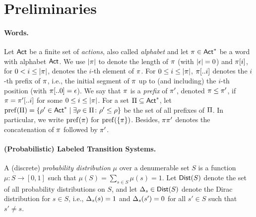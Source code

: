 \section{Preliminaries}
\label{sec:preliminaries}



\paragraph{Words.} Let ${\rm \sf Act}$ be a finite set of \emph{actions}, also called
\emph{alphabet} and let $\pi\in{\rm \sf Act}^*$ be a word with alphabet
${\rm \sf Act}$.  We use ${|}{\pi}{|}$ to denote the length of $\pi$ (with
${|}{\epsilon}{|}=0$) and $\pi[i]$, for $0<i\leq{|}{\pi}{|}$,
denotes the $i$-th element of $\pi$.
%
For $0\leq i\leq{|}{\pi}{|}$, $\pi[..i]$ denotes the $i$-th prefix
of $\pi$, i.e., the initial segment of $\pi$ up to (and including)
the $i$-th position (with $\pi[..0] = \epsilon$).
%
We say that $\pi$ is a \emph{prefix} of $\pi'$, denoted
$\pi\leq\pi'$, if $\pi=\pi'[..i]$ for some $0\leq
i\leq{|}{\pi}{|}$.  For a set $\Pi\subseteq{\rm \sf Act}^*$, let
$\mathrm{pref}(\Pi)=\{\rho'\in{\rm \sf Act}^*\mid{\exists{\rho\in\Pi}\colon{\rho'\leq\rho}}\}$
be the set of all prefixes of $\Pi$.  In particular, we write
$\mathrm{pref}(\pi)$ for $\mathrm{pref}(\{\pi\})$.
%
Besides, $\pi\pi'$ denotes the concatenation of $\pi$ followed by
$\pi'$.


\paragraph{(Probabilistic) Labeled Transition Systems.} 
A (discrete) \emph{probability distribution} $\mu$ over a denumerable
set $S$ is a function $\mu: S \rightarrow [0, 1] $ such that
$\mu(S) = \sum_{s \in S} \mu(s) = 1$.  Let $\mathsf{Dist}(S)$ denote the set
of all probability distributions on $S$, and let $\Delta_s \in \mathsf{Dist}(S)$
denote the Dirac distribution for $s \in S$, i.e., $\Delta_s(s) =1$
and $\Delta_s(s') = 0$ for all $s' \in S$ such that $s'\neq s$.



